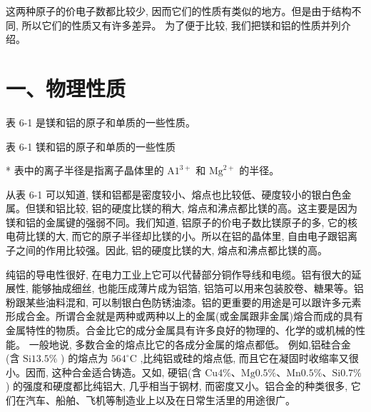 \documentclass[10pt]{article}
\begin{document}
这两种原子的价电子数都比较少, 因而它们的性质有类似的地方。但是由于结构不同, 所以它们的性质又有许多差异。 为了便于比较, 我们把镁和铝的性质并列介绍。

\section*{一、物理性质}

表 6-1 是镁和铝的原子和单质的一些性质。

表 6-1 镁和铝的原子和单质的一些性质

\begin{center}
\end{center}

* 表中的离子半径是指离子晶体里的 \(\mathrm{A}{1}^{3 + }\) 和 \({\mathrm{{Mg}}}^{2 + }\) 的半径。

从表 6-1 可以知道, 镁和铝都是密度较小、熔点也比较低、硬度较小的银白色金属。但镁和铝比较, 铝的硬度比镁的稍大, 熔点和沸点都比镁的高。这主要是因为镁和铝的金属键的强弱不同。我们知道, 铝原子的价电子数比镁原子的多, 它的核电荷比镁的大, 而它的原子半径却比镁的小。所以在铝的晶体里, 自由电子跟铝离子之间的作用比较强。因此, 铝的硬度比镁的大, 熔点和沸点都比镁的高。

纯铝的导电性很好, 在电力工业上它可以代替部分铜作导线和电缆。铝有很大的延展性, 能够抽成细丝, 也能压成薄片成为铝箔, 铝箔可以用来包装胶卷、糖果等。铝粉跟某些油料混和, 可以制银白色防锈油漆。铝的更重要的用途是可以跟许多元素形成合金。所谓合金就是两种或两种以上的金属(或金属跟非金属)熔合而成的具有金属特性的物质。合金比它的成分金属具有许多良好的物理的、化学的或机械的性能。 一般地说, 多数合金的熔点比它的各成分金属的熔点都低。 例如,铝硅合金 (含 \(\mathrm{{Si}}{13.5}\%\) ) 的熔点为 \({564}^{ \circ }\mathrm{C}\) ,比纯铝或硅的熔点低, 而且它在凝固时收缩率又很小。因而, 这种合金适合铸造。又如, 硬铝(含 \(\mathrm{{Cu}}4\% \text{、}\mathrm{{Mg}}{0.5}\% \text{、}\mathrm{{Mn}}{0.5}\% \text{、}\mathrm{{Si}}{0.7}\%\) ) 的强度和硬度都比纯铝大, 几乎相当于钢材, 而密度又小。铝合金的种类很多, 它们在汽车、船舶、飞机等制造业上以及在日常生活里的用途很广。
\end{document}
